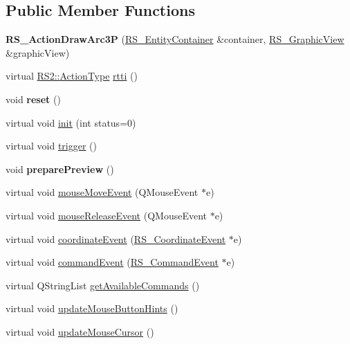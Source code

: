 \subsection*{Public Member Functions}
\begin{DoxyCompactItemize}
\item 
\hypertarget{classRS__ActionDrawArc3P_a7653ba803c23a5ffbe398f8d416ace9d}{{\bfseries R\-S\-\_\-\-Action\-Draw\-Arc3\-P} (\hyperlink{classRS__EntityContainer}{R\-S\-\_\-\-Entity\-Container} \&container, \hyperlink{classRS__GraphicView}{R\-S\-\_\-\-Graphic\-View} \&graphic\-View)}\label{classRS__ActionDrawArc3P_a7653ba803c23a5ffbe398f8d416ace9d}

\item 
virtual \hyperlink{classRS2_afe3523e0bc41fd637b892321cfc4b9d7}{R\-S2\-::\-Action\-Type} \hyperlink{classRS__ActionDrawArc3P_ae6cedced08b54f149df4bddfed247af4}{rtti} ()
\item 
\hypertarget{classRS__ActionDrawArc3P_a523b8ed4d2b66f38c5238f0a36a2b57a}{void {\bfseries reset} ()}\label{classRS__ActionDrawArc3P_a523b8ed4d2b66f38c5238f0a36a2b57a}

\item 
virtual void \hyperlink{classRS__ActionDrawArc3P_ac50e9d0c26220b267fd84bb0f164baea}{init} (int status=0)
\item 
virtual void \hyperlink{classRS__ActionDrawArc3P_ad472014ca82e009ee153f6ce91f3504e}{trigger} ()
\item 
\hypertarget{classRS__ActionDrawArc3P_a601d856b6dc6b72ce50a93e1747be3e6}{void {\bfseries prepare\-Preview} ()}\label{classRS__ActionDrawArc3P_a601d856b6dc6b72ce50a93e1747be3e6}

\item 
virtual void \hyperlink{classRS__ActionDrawArc3P_a307c007bd4db5dc79af497f22bc98fe7}{mouse\-Move\-Event} (Q\-Mouse\-Event $\ast$e)
\item 
virtual void \hyperlink{classRS__ActionDrawArc3P_afd9aa36a9630f57f32b1a549cffd64ce}{mouse\-Release\-Event} (Q\-Mouse\-Event $\ast$e)
\item 
virtual void \hyperlink{classRS__ActionDrawArc3P_a5558305c8f2ff7ce37d8c5f8d451ff67}{coordinate\-Event} (\hyperlink{classRS__CoordinateEvent}{R\-S\-\_\-\-Coordinate\-Event} $\ast$e)
\item 
virtual void \hyperlink{classRS__ActionDrawArc3P_aa1c7b9dac0f46564eb80ece9330bcc34}{command\-Event} (\hyperlink{classRS__CommandEvent}{R\-S\-\_\-\-Command\-Event} $\ast$e)
\item 
virtual Q\-String\-List \hyperlink{classRS__ActionDrawArc3P_a5e6d23c8a09b7669e6d6ec1f4766be6a}{get\-Available\-Commands} ()
\item 
virtual void \hyperlink{classRS__ActionDrawArc3P_a34aa07e9515d9737eb92b4917167188a}{update\-Mouse\-Button\-Hints} ()
\item 
virtual void \hyperlink{classRS__ActionDrawArc3P_a5d7cd960a26d1960628545daa5287558}{update\-Mouse\-Cursor} ()
\end{DoxyCompactItemize}
